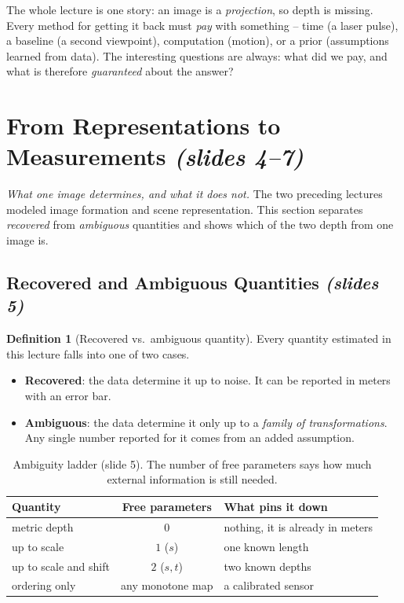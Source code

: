 \documentclass[11pt,a4paper]{article}
\numberwithin{equation}{section}
\newcommand{\slides}[1]{\texorpdfstring{\;\emph{(slides #1)}}{ (slides #1)}}
\theoremstyle{plain}
\theoremstyle{definition}
\newtheorem{definition}[theorem]{Definition}
\begin{document}
\begin{intuition}
The whole lecture is one story: an image is a \emph{projection}, so depth is missing. Every method for getting it back must \emph{pay} with something -- time (a laser pulse), a baseline (a second viewpoint), computation (motion), or a prior (assumptions learned from data). The interesting questions are always: what did we pay, and what is therefore \emph{guaranteed} about the answer?
\end{intuition}
 
\section{From Representations to Measurements \slides{4--7}}
\emph{What one image determines, and what it does not.} The two preceding lectures modeled image formation and scene representation. This section separates \emph{recovered} from \emph{ambiguous} quantities and shows which of the two depth from one image is.
 
\subsection{Recovered and Ambiguous Quantities \slides{5}}
 
\begin{definition}[Recovered vs.\ ambiguous quantity]
Every quantity estimated in this lecture falls into one of two cases.
\begin{itemize}
\item \textbf{Recovered}: the data determine it up to noise. It can be reported in meters with an error bar.
\item \textbf{Ambiguous}: the data determine it only up to a \emph{family of transformations}. Any single number reported for it comes from an added assumption.
\end{itemize}
\end{definition}
 
\begin{table}[htbp]
\centering\small
\begin{tabular}{lcp{5.6cm}}
\toprule
Quantity & Free parameters & What pins it down\\
\midrule
metric depth & $0$ & nothing, it is already in meters\\
up to scale & $1$ ($s$) & one known length\\
up to scale and shift & $2$ ($s,t$) & two known depths\\
ordering only & any monotone map & a calibrated sensor\\
\bottomrule
\end{tabular}
\caption{Ambiguity ladder (slide 5). The number of free parameters says how much external information is still needed.}
\end{table}
 
\end{document}
